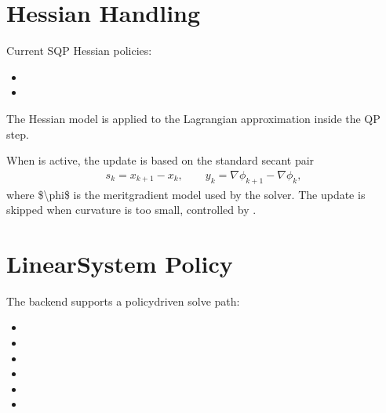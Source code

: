 \documentclass[letterpaper,10pt,english]{sphinxmanual}
\begin{document}
\section{Hessian Handling}
\label{\detokenize{optima_sequential_qp:hessian-handling}}
\sphinxAtStartPar
Current SQP Hessian policies:
\begin{itemize}
\item {} 
\sphinxAtStartPar
{}

\item {} 
\sphinxAtStartPar
{}

\end{itemize}

\sphinxAtStartPar
The Hessian model is applied to the Lagrangian approximation inside the QP step.

\sphinxAtStartPar
When  is active, the update is based on the standard secant pair
\begin{equation*}
\begin{split}s_k = x_{k+1} - x_k,\qquad
y_k = \nabla \phi_{k+1} - \nabla \phi_k,\end{split}
\end{equation*}
\sphinxAtStartPar
where \$\textbackslash{}phi\$ is the merit\sphinxhyphen{}gradient model used by the solver. The update is skipped when curvature is too small, controlled by .


\section{Linear\sphinxhyphen{}System Policy}
\label{\detokenize{optima_sequential_qp:linear-system-policy}}
\sphinxAtStartPar
The backend supports a policy\sphinxhyphen{}driven solve path:
\begin{itemize}
\item {} 
\sphinxAtStartPar
{}

\item {} 
\sphinxAtStartPar
{}

\item {} 
\sphinxAtStartPar
{}

\item {} 
\sphinxAtStartPar
{}

\item {} 
\sphinxAtStartPar
{}

\item {} 
\sphinxAtStartPar
{}

\end{itemize}
\end{document}
